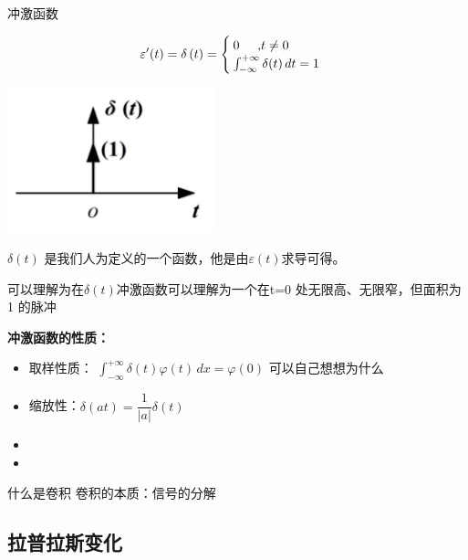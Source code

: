 \documentclass[UTF8,a4paper,12pt]{ctexart}
\begin{document}
    \begin{titlebox}{冲激函数}
      
      $$\varepsilon'(t)= \delta \left( t \right)=
      \begin{cases}
       0 \text{\hspace{0.5cm},$t\ne 0$}\\
       \int_{-\infty }^{+\infty } \delta(t) \, dt=1
      \end{cases}$$
      \begin{center}
        \par \includegraphics[width=6cm]{picture/deta_signal.png}
      \end{center}
      \begin{flushleft}
        $\delta(t)$ 是我们人为定义的一个函数，他是由$ \varepsilon (t)$求导可得。
        \par 可以理解为在$\delta(t)$冲激函数可以理解为一个在t=0 处无限高、无限窄，但面积为 1 的脉冲
      \end{flushleft}
       \par \textbf{冲激函数的性质：}
       \begin{itemize} 
        \item 取样性质： $\int_{-\infty }^{+\infty } \delta(t)\varphi(t)  \, dx=\varphi(0) $ {\scriptsize 可以自己想想为什么}  
        \item 缩放性：$\delta (at) =\dfrac{1}{|a|}  \delta ( t ) $
        \item 
        \item  
      \end{itemize}
    \end{titlebox}
      
  \begin{flushleft}
    \begin{titlebox}{什么是卷积}
      卷积的本质：信号的分解
    \end{titlebox}
  \end{flushleft}
  \subsection{拉普拉斯变化}


  \section{}
\end{document}
